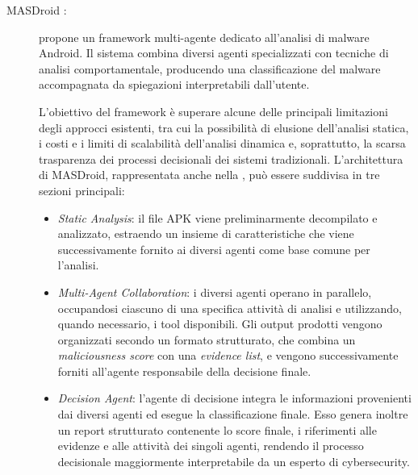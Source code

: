 \begin{description}

    \item[MASDroid \cite{wei2026masdroid}:] propone un framework multi-agente dedicato all'analisi di malware Android. Il sistema combina diversi agenti specializzati con tecniche di analisi comportamentale, producendo una classificazione del malware accompagnata da spiegazioni interpretabili dall'utente.

    L'obiettivo del framework è superare alcune delle principali limitazioni degli approcci esistenti, tra cui la possibilità di elusione dell'analisi statica, i costi e i limiti di scalabilità dell'analisi dinamica e, soprattutto, la scarsa trasparenza dei processi decisionali dei sistemi tradizionali. L'architettura di MASDroid, rappresentata anche nella , può essere suddivisa in tre sezioni principali:


    \begin{itemize}
        \item \emph{Static Analysis}: il file APK viene preliminarmente decompilato e analizzato, estraendo un insieme di caratteristiche che viene successivamente fornito ai diversi agenti come base comune per l'analisi.

        \item \emph{Multi-Agent Collaboration}: i diversi agenti operano in parallelo, occupandosi ciascuno di una specifica attività di analisi e utilizzando, quando necessario, i tool disponibili. Gli output prodotti vengono organizzati secondo un formato strutturato, che combina un \emph{maliciousness score} con una \emph{evidence list}, e vengono successivamente forniti all'agente responsabile della decisione finale.

        \item \emph{Decision Agent}: l'agente di decisione integra le informazioni provenienti dai diversi agenti ed esegue la classificazione finale. Esso genera inoltre un report strutturato contenente lo score finale, i riferimenti alle evidenze e alle attività dei singoli agenti, rendendo il processo decisionale maggiormente interpretabile da un esperto di cybersecurity.
    \end{itemize}


\end{description}
